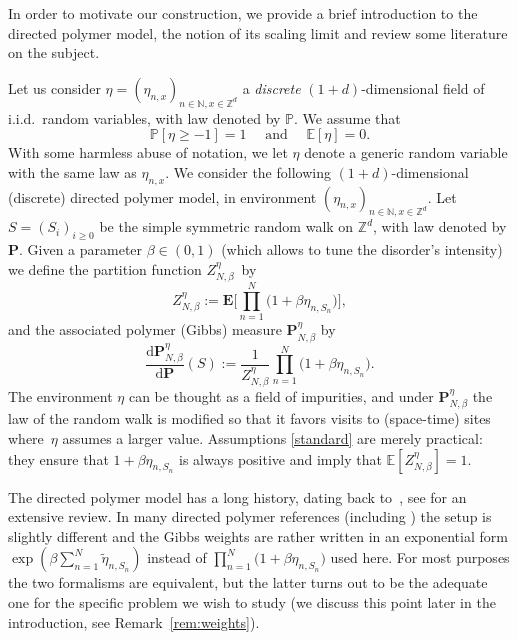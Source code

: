 \documentclass[10pt]{amsart}
\theoremstyle{definition}
\newcommand{\dd}{\mathrm{d}}
\newcommand{\bP}{{\ensuremath{\mathbf P}} }
\newcommand{\bE}{{\ensuremath{\mathbf E}} }
\newcommand{\bbE}{{\ensuremath{\mathbb E}} }
\newcommand{\bbN}{{\ensuremath{\mathbb N}} }
\newcommand{\bbP}{{\ensuremath{\mathbb P}} }
\newcommand{\bbZ}{{\ensuremath{\mathbb Z}} }
\begin{document}
In order to motivate our construction, we provide a brief introduction to the directed polymer model, the notion of its scaling limit and review some literature on the subject.

\label{sec:discrete}

Let us consider $\eta=(\eta_{n,x})_{n\in \bbN, x\in \bbZ^d}$ a \emph{discrete} $(1+d)$-dimensional field of i.i.d.\ random variables, with law denoted by $\bbP$.
We assume that
\begin{equation} \label{standard}
\bbP[\eta \ge -1]=1 \quad \text{ and } \quad \bbE[\eta]=0.
\end{equation}
With some harmless abuse of notation, we let $\eta$ denote a generic random variable with the same law as $\eta_{n,x}$.
We consider the following $(1+d)$-dimensional (discrete) directed polymer model, in environment $(\eta_{n,x})_{n\in \bbN, x\in \bbZ^d}$.
Let $S=(S_i)_{i\geq 0}$ be the simple symmetric random walk on $\bbZ^d$, with law denoted by $\bP$.
Given a parameter $\beta\in (0,1)$ (which allows to tune the disorder's intensity) we define the partition function $Z^{\eta}_{N,\beta}$~by\vspace*{-3pt}\enlargethispage{.3\baselineskip}%
%
\begin{equation}
\label{def:Zn}
Z^{\eta}_{N,\beta}:= \bE\biggl[\prod_{n=1}^N \bigl(1+\beta \eta_{n,S_n} \bigr) \biggr],
\end{equation}
and the associated polymer (Gibbs) measure $\bP^{\eta}_{N,\beta}$ by\vspace*{-3pt}
\begin{equation}\label{polymers}
\frac{ \dd \bP^{\eta}_{N,\beta}}{\dd \bP}(S):=\frac{1}{Z^{\eta}_{N,\beta}} \prod_{n=1}^N \bigl(1+\beta \eta_{n,S_n} \bigr).
\end{equation}
The environment $\eta$ can be thought as a field of impurities, and under
$\bP^{\eta}_{N,\beta}$ the law of the random walk is modified so that it favors visits to (space-time) sites where~$\eta$ assumes a larger value. Assumptions \eqref{standard} are merely practical:
they ensure that $1+\beta \eta_{n,S_n}$ is always positive and imply that $\bbE [ Z^{\eta}_{N,\beta}]=1$.

The directed polymer model has a long history, dating back to~\cite{HH85}, see \cite{C17} for an extensive review. In many directed polymer references (including \cite{C17}) the setup is slightly different and the Gibbs weights are rather written in an exponential form $\exp(\beta \sum_{n=1}^{N} \tilde\eta_{n,S_n})$ instead of $\prod_{n=1}^N \bigl(1+\beta \eta_{n,S_n} \bigr)$ used here.
For most purposes the two formalisms are equivalent, but the latter turns out to be the adequate one for the specific problem we wish to study (we discuss this point later in the introduction, see Remark~\ref{rem:weights}).
\end{document}
